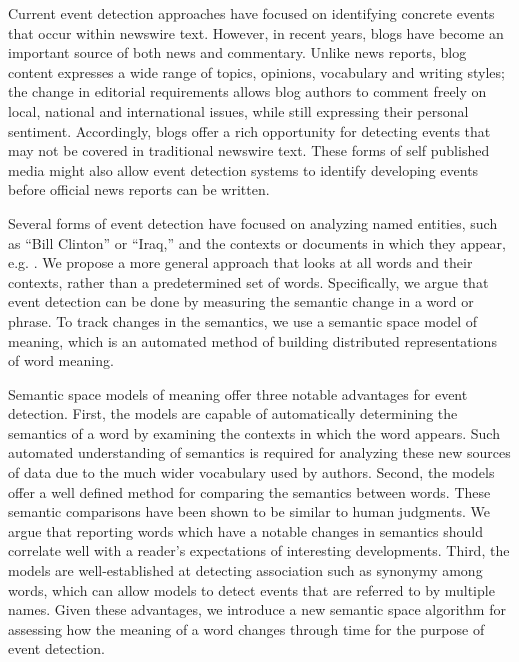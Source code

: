 \documentclass[a4paper,twocolumn,twoside,10pt]{ranlp}
\begin{document}
Current event detection approaches have focused on identifying concrete events
that occur within newswire text\cite{kumaran04entityevent}.  However, in recent
years, blogs have become an important source of both news and commentary.  Unlike
news reports, blog content expresses a wide range of topics, opinions,
vocabulary and writing styles; the change in editorial requirements allows blog
authors to comment freely on local, national and international issues, while
still expressing their personal sentiment.  Accordingly, blogs offer a rich
opportunity for detecting events that may not be covered in traditional newswire
text.  These forms of self published media might also allow event detection
systems to identify developing events before official news reports can be written.

Several forms of event detection have focused on analyzing named entities, such
as ``Bill Clinton'' or ``Iraq,'' and the contexts or documents in which they
appear, e.g.
\cite{kontostathis04use,kumaran04entityevent,fortuna09visualization}.  We
propose a more general approach that looks at all words and their contexts,
rather than a predetermined set of words.  Specifically, we argue that event
detection can be done by measuring the semantic change in a word or phrase.  To
track changes in the semantics, we use a semantic space model of meaning, which
is an automated method of building distributed representations of word meaning.

Semantic space models of meaning offer three notable advantages for event
detection.
%
First, the models are capable of automatically determining the semantics of a
word by examining the contexts in which the word appears.  Such automated
understanding of semantics is required for analyzing these new sources of data
due to the much wider vocabulary used by authors.
%
Second, the models offer a well defined method for comparing the semantics
between words.  These semantic comparisons have been shown to be similar to
human judgments\cite{landauer97solution}.  We argue that reporting words which
have a notable changes in semantics should correlate well with a reader's
expectations of interesting developments.
%
Third, the models are well-established at detecting association such as synonymy
among words, which can allow models to detect events that are referred to by
multiple names.
%
Given these advantages, we introduce a new semantic space algorithm for
assessing how the meaning of a word changes through time for the purpose of
event detection.
\end{document}
